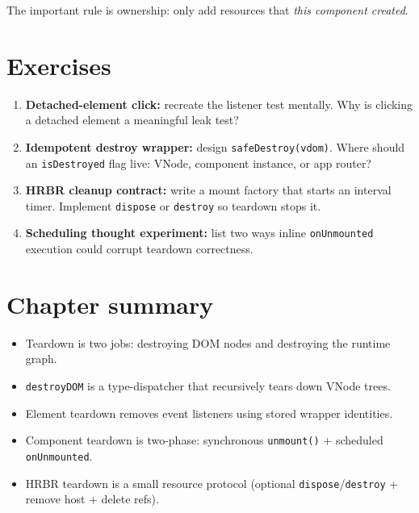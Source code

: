 The important rule is ownership: only add resources that \emph{this component created}.

\section{Exercises}

\begin{enumerate}
  \item \textbf{Detached-element click:}
    recreate the listener test mentally. Why is clicking a detached element a meaningful leak test?

  \item \textbf{Idempotent destroy wrapper:}
    design \texttt{safeDestroy(vdom)}. Where should an \texttt{isDestroyed} flag live: VNode, component instance, or app router?

  \item \textbf{HRBR cleanup contract:}
    write a mount factory that starts an interval timer. Implement \texttt{dispose} or \texttt{destroy} so teardown stops it.

  \item \textbf{Scheduling thought experiment:}
    list two ways inline \texttt{onUnmounted} execution could corrupt teardown correctness.
\end{enumerate}

\section{Chapter summary}

\begin{itemize}
  \item Teardown is two jobs: destroying DOM nodes and destroying the runtime graph.
  \item \texttt{destroyDOM} is a type-dispatcher that recursively tears down VNode trees.
  \item Element teardown removes event listeners using stored wrapper identities.
  \item Component teardown is two-phase: synchronous \texttt{unmount()} + scheduled \texttt{onUnmounted}.
  \item HRBR teardown is a small resource protocol (optional \texttt{dispose}/\texttt{destroy} + remove host + delete refs).
\end{itemize}
